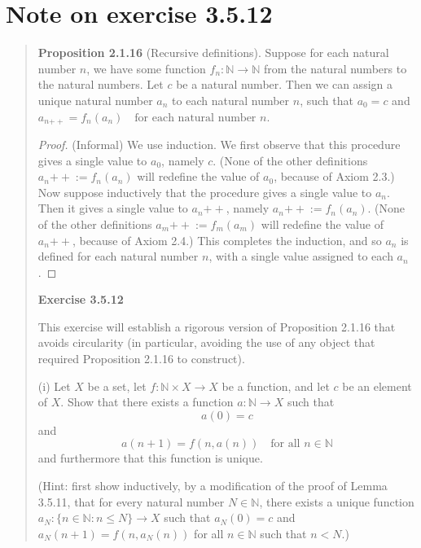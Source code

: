 \documentclass{article}
\newcommand{\doubleplus}{\mathbin{{+}{+}}}
\begin{document}
\section{Note on exercise 3.5.12}

\begin{quotation}
    \textbf{Proposition 2.1.16} (Recursive definitions).
    Suppose for each natural number $n$, we have some function $f_n : \mathbb{N} \to \mathbb{N}$
    from the natural numbers to the natural numbers.
    Let $c$ be a natural number.
    Then we can assign a unique natural number $a_n$ to each natural number $n$, such that
    $a_0 = c$ and $a_{n\doubleplus} = f_n(a_n) \quad \text{for each natural number } n$.
    \begin{proof}
        (Informal) We use induction.
        We first observe that this procedure gives a single value to $a_0$, namely $c$.
        (None of the other definitions $a_n\doubleplus := f_n(a_n)$ will redefine the value of $a_0$,
        because of Axiom 2.3.)
        Now suppose inductively that the procedure gives a single value to $a_n$.
        Then it gives a single value to $a_n\doubleplus$, namely $a_n\doubleplus := f_n(a_n)$.
        (None of the other definitions $a_m\doubleplus := f_m(a_m)$ will redefine the value of $a_n\doubleplus$,
        because of Axiom 2.4.)
        This completes the induction, and so $a_n$ is defined for each natural number $n$,
        with a single value assigned to each $a_n$.
    \end{proof}

    \textbf{Exercise 3.5.12}

    This exercise will establish a rigorous version of Proposition 2.1.16 that avoids circularity
    (in particular, avoiding the use of any object that required Proposition 2.1.16 to construct).

    (i) Let $X$ be a set, let $f : \mathbb{N} \times X \to X$ be a function,
    and let $c$ be an element of $X$. Show that there exists a function $a: \mathbb{N} \to X$ such that
    \[
        a(0) = c
    \]
    and
    \[
        a(n+1) = f(n, a(n)) \quad \text{for all } n \in \mathbb{N}
    \]
    and furthermore that this function is unique.

    (Hint: first show inductively, by a modification of the proof of Lemma 3.5.11,
    that for every natural number $N \in \mathbb{N}$,
    there exists a unique function $a_N : \{n \in \mathbb{N} : n \leq N\} \to X$
    such that $a_N(0) = c$ and $a_N(n+1) = f(n, a_N(n))$ for all $n \in \mathbb{N}$ such that $n < N$.)


\end{quotation}
\end{document}

